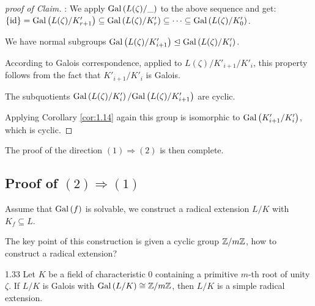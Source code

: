 \documentclass[twoside = false,	%
		headsepline,		%
		parskip = true,
		]{scrbook}						%
\begin{document}
    \begin{proof} [proof of Claim]:
        We apply $\mathrm{Gal}\left( L(\zeta)/\_\right)$ to the above sequence and get:
        $\{\mathrm{id}\} = \mathrm{Gal}\left( L(\zeta)/K'_{r+1}\right) \subseteq \mathrm{Gal}\left( L(\zeta)/K'_r\right) \subseteq \dots \subseteq \mathrm{Gal}\left( L(\zeta)/K'_0\right)$.
        
        We have normal subgroups $\mathrm{Gal}\left( L(\zeta)/K'_{i+1}\right) \trianglelefteq \mathrm{Gal}\left( L(\zeta)/K'_i\right)$.
        
        According to Galois correspondence, applied to $L(\zeta)/K'_{i+1}/K'_i$, this property follows from the fact that $K'_{i+1}/K'_i$ is Galois.
        
        The subquotients $\mathrm{Gal}\left( L(\zeta)/K'_i\right)/\mathrm{Gal}\left( L(\zeta)/K'_{i+1}\right)$ are cyclic.
        
        Applying Corollary \ref{cor:1.14} again this group is isomorphic to $\mathrm{Gal}\left( K'_{i+1}/K'_i\right)$, which is cyclic.
        
    \end{proof}
    
    The proof of the direction $(1) \Rightarrow (2)$ is then complete.
    
    \subsection*{Proof of $(2)\Rightarrow (1)$} 
    Assume that $\mathrm{Gal}\left( f\right)$ is solvable, we construct a radical extension $L/K$ with $K_f \subseteq L$.
    
    The key point of this construction is given a cyclic group $\mathbb Z/m\mathbb Z$, how to construct a radical extension?
    
    \begin{lemma}{}{1.33}
        Let $K$ be a field of characteristic $0$ containing a primitive $m$-th root of unity $\zeta$. If $L/K$ is Galois with $\mathrm{Gal}\left( L/K\right) \cong \mathbb Z/m\mathbb Z$, then $L/K$ is a simple radical extension.
    \end{lemma}
    
\end{document}
